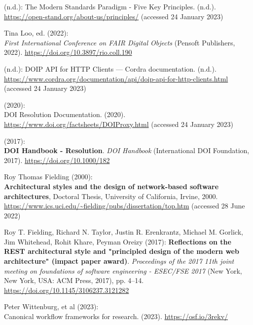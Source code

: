 \begin{thebibliography}{9}
(n.d.): The {Modern Standards Paradigm} - {Five Key Principles}. (n.d.).
\url{https://open-stand.org/about-us/principles/} (accessed 24 January
2023)

Tina Loo, ed. (2022): \\
\emph{First {International Conference} on {FAIR
Digital Objects}} ({Pensoft Publishers}, 2022).
\url{https://doi.org/10.3897/rio.coll.190}

(n.d.): {DOIP API} for {HTTP Clients} --- {Cordra} documentation.
(n.d.).
\url{https://www.cordra.org/documentation/api/doip-api-for-http-clients.html}
(accessed 24 January 2023)

(2020): \\
{DOI Resolution Documentation}. (2020).
\url{https://www.doi.org/factsheets/DOIProxy.html} (accessed 24 January
2023)

(2017): \\
\textbf{{DOI Handbook} - {Resolution}}. \emph{{DOI Handbook}}
({International DOI Foundation}, 2017).
\url{https://doi.org/10.1000/182}

Roy Thomas Fielding (2000): \\
\textbf{Architectural styles and the design
of network-based software architectures}, Doctoral Thesis, {University
of California, Irvine}, 2000.
\url{https://www.ics.uci.edu/~fielding/pubs/dissertation/top.htm}
(accessed 28 June 2022)

Roy T. Fielding, Richard N. Taylor, Justin R. Erenkrantz, Michael M.
Gorlick, Jim Whitehead, Rohit Khare, Peyman Oreizy (2017):
\textbf{Reflections on the {REST} architectural style and "principled
design of the modern web architecture" (impact paper award)}.
\emph{Proceedings of the 2017 11th joint meeting on foundations of
software engineering - {ESEC}/{FSE} 2017} ({New York, New York, USA}:
{ACM Press}, 2017), pp. 4--14.
\url{https://doi.org/10.1145/3106237.3121282}

Peter Wittenburg, et al (2023): \\
Canonical workflow frameworks for
research. (2023). \url{https://osf.io/3rekv/}


\end{thebibliography}
